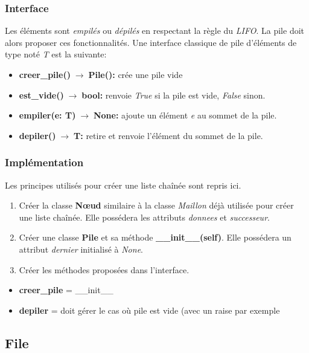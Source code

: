 \documentclass[a4paper,11pt]{article}
\begin{document}
\begin{Form}
\subsubsection{Interface}
Les éléments sont \emph{empilés} ou \emph{dépilés} en respectant la règle du \emph{LIFO}. La pile doit alors proposer ces fonctionnalités. Une interface classique de pile  d'éléments de type noté \emph{T} est la suivante:
\begin{itemize}
\item \textbf{creer\_pile()$\;\rightarrow\;$Pile():} crée une pile vide
\item \textbf{est\_vide()$\;\rightarrow\;$bool:} renvoie \emph{True} si la pile est vide, \emph{False} sinon.
\item \textbf{empiler(e: T)$\;\rightarrow\;$None:} ajoute un élément \emph{e} au sommet de la pile.
\item \textbf{depiler()$\;\rightarrow\;$T:} retire et renvoie l'élément du sommet de la pile.
\end{itemize}
\subsubsection{Implémentation}
Les principes utilisés pour créer une liste chaînée sont repris ici.
\begin{activite}
\begin{enumerate}
\item Créer la classe \textbf{Nœud} similaire à la classe \emph{Maillon} déjà utilisée pour créer une liste chaînée. Elle possédera les attributs \emph{donnees} et \emph{successeur}.
\item Créer une classe \textbf{Pile} et sa méthode \textbf{\_\_init\_\_(self)}. Elle possédera un attribut \emph{dernier} initialisé à \emph{None}.
\item Créer les méthodes proposées dans l'interface.
\end{enumerate}
\end{activite}
\begin{commentprof}
\begin{itemize}
\item \textbf{creer\_pile} = \_\_init\_\_
\item \textbf{depiler} = doit gérer le cas où pile est vide (avec un raise par exemple
\end{itemize}
\end{commentprof}
\subsection{File}

\end{Form}
\end{document}
